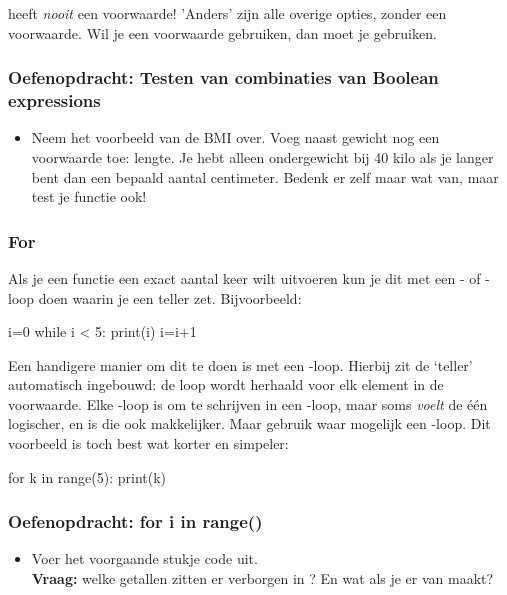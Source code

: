 \documentclass[a4paper,11pt, fleqn]{article}
\begin{document}
 heeft {\it nooit} een voorwaarde! 'Anders' zijn alle overige opties, zonder een voorwaarde. Wil je een voorwaarde gebruiken, dan moet je  gebruiken.


\subsubsection*{Oefenopdracht: Testen van combinaties van Boolean expressions} 
\begin{itemize}
	\item Neem het voorbeeld van de BMI over. Voeg naast gewicht nog een voorwaarde toe: lengte. Je hebt alleen ondergewicht bij 40 kilo als je langer bent dan een bepaald aantal centimeter. Bedenk er zelf maar wat van, maar test je functie ook!
\end{itemize}

\subsubsection{For}
Als je een functie een exact aantal keer wilt uitvoeren kun je dit met een - of -loop doen waarin je een teller zet. Bijvoorbeeld:
\begin{python}
i=0
while i < 5:
    print(i)
    i=i+1
\end{python}
Een handigere manier om dit te doen is met een -loop. Hierbij zit de `teller' automatisch ingebouwd: de loop wordt herhaald voor elk element in de voorwaarde. Elke -loop is om te schrijven in een -loop, maar soms \textit{voelt} de \'e\'en logischer, en is die ook makkelijker. Maar gebruik waar mogelijk een -loop. Dit voorbeeld is toch best wat korter en simpeler:

\begin{python}
for k in range(5):
    print(k)
\end{python}

\subsubsection*{Oefenopdracht: for i in range()}
\begin{itemize}
	\item Voer het voorgaande stukje code uit. \\
	\textbf{Vraag:} welke getallen zitten er verborgen in ? En wat als je er  van maakt?
\end{itemize}
\end{document}
